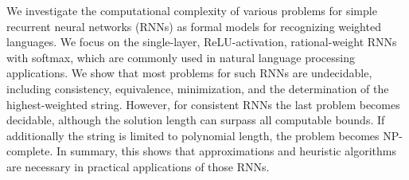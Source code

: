 We investigate the computational complexity of various problems for simple recurrent neural networks (RNNs) as formal models for recognizing weighted languages.  We focus on the single-layer, ReLU-activation, rational-weight RNNs with softmax, which are commonly used in natural language processing applications.  We show that most problems for such RNNs are undecidable, including consistency, equivalence, minimization, and the determination of the highest-weighted string. However, for consistent RNNs the last problem becomes decidable, although the solution length can surpass all computable bounds.  If additionally the string is limited to polynomial length, the problem becomes NP-complete. In summary, this shows that approximations and heuristic algorithms are necessary in practical applications of those RNNs.
